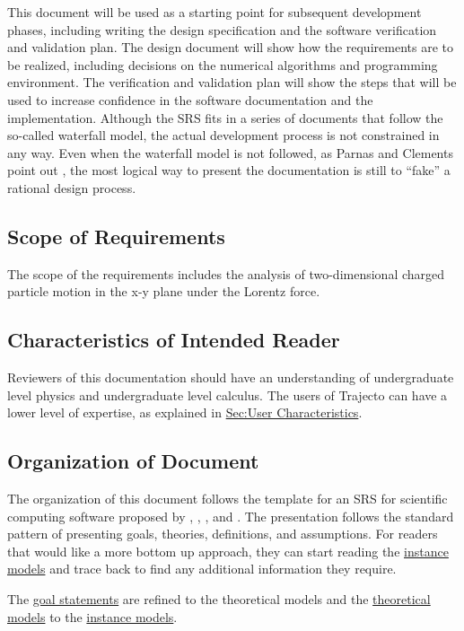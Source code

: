 \documentclass[12pt]{article}
\begin{document}
This document will be used as a starting point for subsequent development phases, including writing the design specification and the software verification and validation plan. The design document will show how the requirements are to be realized, including decisions on the numerical algorithms and programming environment. The verification and validation plan will show the steps that will be used to increase confidence in the software documentation and the implementation. Although the SRS fits in a series of documents that follow the so-called waterfall model, the actual development process is not constrained in any way. Even when the waterfall model is not followed, as Parnas and Clements point out \cite{parnasClements1986}, the most logical way to present the documentation is still to ``fake'' a rational design process.

\subsection{Scope of Requirements}
\label{Sec:ReqsScope}
The scope of the requirements includes the analysis of two-dimensional charged particle motion in the x-y plane under the Lorentz force.

\subsection{Characteristics of Intended Reader}
\label{Sec:ReaderChars}
Reviewers of this documentation should have an understanding of undergraduate level physics and undergraduate level calculus. The users of Trajecto can have a lower level of expertise, as explained in \hyperref[Sec:UserChars]{Sec:User Characteristics}.

\subsection{Organization of Document}
\label{Sec:DocOrg}
The organization of this document follows the template for an SRS for scientific computing software proposed by \cite{koothoor2013}, \cite{smithLai2005}, \cite{smithEtAl2007}, and \cite{smithKoothoor2016}. The presentation follows the standard pattern of presenting goals, theories, definitions, and assumptions. For readers that would like a more bottom up approach, they can start reading the \hyperref[Sec:IMs]{instance models} and trace back to find any additional information they require.

The \hyperref[Sec:GoalStmt]{goal statements} are refined to the theoretical models and the \hyperref[Sec:TMs]{theoretical models} to the \hyperref[Sec:IMs]{instance models}.
\end{document}
